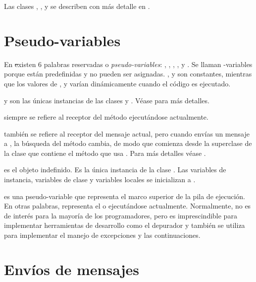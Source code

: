 \documentclass[a4paper,10pt,twoside]{book}
\begin{document}
Las clases , ,  y  se describen con más detalle en .

\section{Pseudo-variables}

En \st existen 6 palabras reservadas o \emph{pseudo-variables}:
, ,  ,  ,  y .
Se llaman  -variables porque están predefinidas y no pueden ser asignadas.
,  y  son constantes, mientras que los valores de ,  y  varían dinámicamente cuando el código es ejecutado.

 y  son las únicas instancias de las clases   y .
Véase  para más detalles.

 siempre se refiere al receptor del método ejecutándose actualmente.

 también se refiere al receptor del mensaje actual, pero cuando envías un mensaje a \super, la búsqueda del método cambia, de modo que comienza desde la superclase de la clase que contiene el método que usa .
Para más detalles véase .

 es el objeto indefinido.
Es la única instancia de la clase . 
Las variables de instancia, variables de clase y variables locales se inicializan a .

 es una pseudo-variable que representa el marco superior de la pila de ejecución.
En otras palabras, representa el  o  ejecutándose actualmente.
Normalmente,  no es de interés para la mayoría de los programadores, pero es imprescindible para implementar herramientas de desarrollo como el depurador y también se utiliza para implementar el manejo de excepciones y las continuaciones.

\section{Envíos de mensajes}
\end{document}
